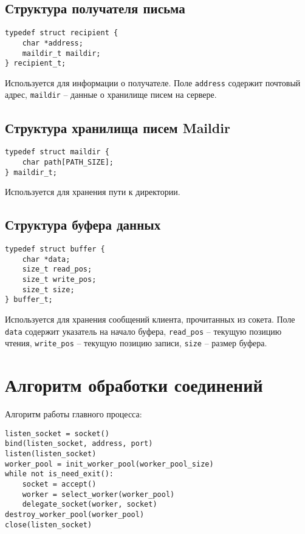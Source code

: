 \subsection{Структура получателя письма}

\begin{verbatim}
typedef struct recipient {
    char *address;
    maildir_t maildir;
} recipient_t;
\end{verbatim}

Используется для информации о получателе.
Поле \verb;address; содержит почтовый адрес,
\verb;maildir; -- данные о хранилище писем на сервере.

\subsection{Структура хранилища писем Maildir}

\begin{verbatim}
typedef struct maildir {
    char path[PATH_SIZE];
} maildir_t;
\end{verbatim}

Используется для хранения пути к директории.

\subsection{Структура буфера данных}

\begin{verbatim}
typedef struct buffer {
    char *data;
    size_t read_pos;
    size_t write_pos;
    size_t size;
} buffer_t;
\end{verbatim}

Используется для хранения сообщений клиента, прочитанных из сокета.
Поле \verb;data; содержит указатель на начало буфера,
\verb;read_pos; -- текущую позицию чтения,
\verb;write_pos; -- текущую позицию записи,
\verb;size; -- размер буфера.

\section{Алгоритм обработки соединений}

Алгоритм работы главного процесса:
\begin{verbatim}
listen_socket = soсket()
bind(listen_socket, address, port)
listen(listen_socket)
worker_pool = init_worker_pool(worker_pool_size)
while not is_need_exit():
    socket = accept()
    worker = select_worker(worker_pool)
    delegate_socket(worker, socket)
destroy_worker_pool(worker_pool)
close(listen_socket)
\end{verbatim}


